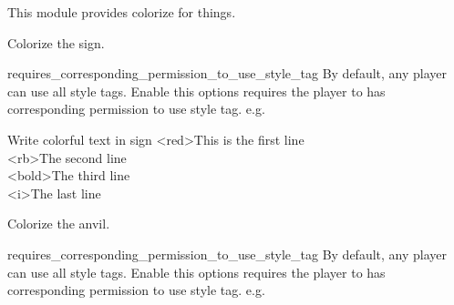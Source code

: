 
This module provides colorize for things.

Colorize the sign.

\begin{Configuration}
    \item[requires\_corresponding\_permission\_to\_use\_style\_tag]{By default, any player can use all style tags. Enable this options requires the player to has corresponding permission to use style tag. e.g. }
\end{Configuration}

\begin{example}{Write colorful text in sign}
    <red>This is the first line\\
    <rb>The second line\\
    <bold>The third line\\
    <i>The last line
\end{example}

Colorize the anvil.

\begin{Configuration}
    \item[requires\_corresponding\_permission\_to\_use\_style\_tag]{By default, any player can use all style tags. Enable this options requires the player to has corresponding permission to use style tag. e.g. }
\end{Configuration}
